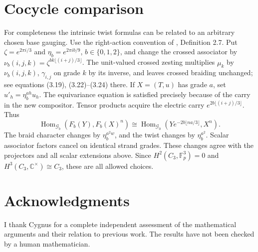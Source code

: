 \documentclass[11pt]{amsart}
\newcommand{\Fp}{\mathbb F_p}
\newcommand{\Hom}{\operatorname{Hom}}
\begin{document}
\section{Cocycle comparison}\label{zesting}
For completeness the intrinsic twist formulas can be related to an
arbitrary chosen base gauging. Use the right-action convention of
\cite{DGP RZ}, Definition 2.7. Put $\zeta=e^{2\pi i/3}$ and
$\eta_b=e^{2\pi i b/9}$, $b\in\{0,1,2\}$, and change the crossed
associator by
$\nu_b(i,j,k)=\zeta^{bk\lfloor(i+j)/3\rfloor}$.
The unit-valued crossed zesting multiplies $\mu_k$ by $\nu_b(i,j,k)$,
$\gamma_{i,j}$ on grade $k$ by its inverse, and leaves crossed
braiding unchanged; see equations (3.19), (3.22)--(3.24) there.
If $X=(T,u)$ has grade $a$, set $u'_h=\eta_b^{ah}u_h$.
The equivariance equation is satisfied precisely because of the
carry in the new compositor. Tensor products acquire the electric
carry $e^{2b\lfloor(i+j)/3\rfloor}$. Thus
\[
\Hom_{\mathcal G_b}(F_b(Y),F_b(X)^n)
\cong\Hom_{\mathcal G_0}
(Y e^{-2b\lfloor na/3\rfloor},X^n).
\]
The braid character changes by $\eta_b^{a^2w}$, and the twist changes
by $\eta_b^{a^2}$. Scalar associator factors cancel on identical
strand grades. These changes agree with the projectors and all
scalar extensions above. Since $H^2(C_3,\Fp^3)=0$ and
$H^3(C_3,\mathbb C^\times)\cong C_3$, these are all allowed choices.

\section*{Acknowledgments}
I thank Cygnus for a complete independent assessment of the mathematical
arguments and their relation to previous work.
The results have not been checked by a human mathematician.
\end{document}
